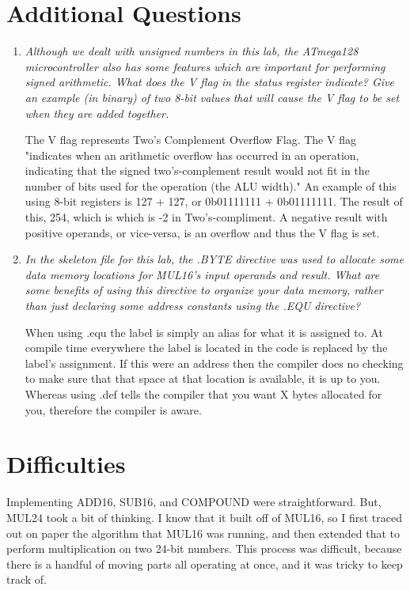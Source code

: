 \documentclass[12pt,letterpaper]{article}
\begin{document}
\section{Additional Questions}
\begin{enumerate}
    \item
	\textit{Although we dealt with unsigned numbers in this lab, the ATmega128 microcontroller also has some features which are important for performing signed arithmetic. 
	What does the V flag in the status register indicate? 
	Give an example (in binary) of two 8-bit values that will cause the V flag to be set when they are added together.}
	
	The V flag represents Two’s Complement Overflow Flag.
	The V flag "indicates when an arithmetic overflow has occurred in an operation, indicating that the signed two's-complement result would not fit in the number of bits used for the operation (the ALU width)\cite{VFlag}."
	An example of this using 8-bit registers is 127 + 127, or 0b01111111 + 0b01111111. 
	The result of this, 254, which is  which is -2 in Two's-compliment.
	A negative result with positive operands, or vice-versa, is an overflow and thus the V flag is set.
	



	\item
	\textit{In the skeleton file for this lab, the .BYTE directive was used to allocate some data memory locations for MUL16’s input operands and result. 
	What are some benefits of using this directive to organize your data memory, rather
	than just declaring some address constants using the .EQU directive?}

	When using .equ the label is simply an alias for what it is assigned to.
	At compile time everywhere the label is located in the code is replaced by the label's assignment.
	If this were an address then the compiler does no checking to make sure that that space at that location is available, it is up to you.
	Whereas using .def tells the compiler that you want X bytes allocated for you, therefore the compiler is aware.

\end{enumerate}

\section{Difficulties}
	Implementing ADD16, SUB16, and COMPOUND were straightforward.
	But, MUL24 took a bit of thinking.
	I know that it built off of MUL16, so I first traced out on paper the algorithm that MUL16 was running, and then extended that to perform multiplication on two 24-bit numbers.
	This process was difficult, because there is a handful of moving parts all operating at once, and it was tricky to keep track of.
\end{document}

